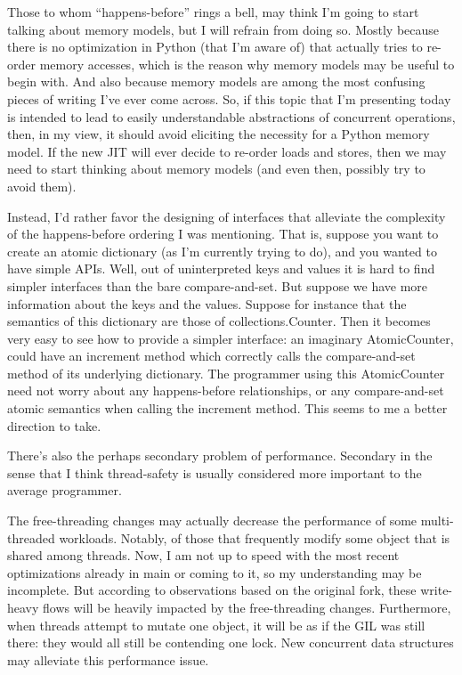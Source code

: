 Those to whom ``happens-before'' rings a bell, may think I'm going to start talking about memory models, but I will refrain from doing so.
Mostly because there is no optimization in Python (that I'm aware of) that actually tries to re-order memory accesses, which is the reason why memory models may be useful to begin with.
And also because memory models are among the most confusing pieces of writing I've ever come across.
So, if this topic that I'm presenting today is intended to lead to easily understandable abstractions of concurrent operations, then, in my view, it should avoid eliciting the necessity for a Python memory model.
If the new JIT will ever decide to re-order loads and stores, then we may need to start thinking about memory models (and even then, possibly try to avoid them).

Instead, I'd rather favor the designing of interfaces that alleviate the complexity of the happens-before ordering I was mentioning.
That is, suppose you want to create an atomic dictionary (as I'm currently trying to do), and you wanted to have simple APIs.
Well, out of uninterpreted keys and values it is hard to find simpler interfaces than the bare compare-and-set.
But suppose we have more information about the keys and the values.
Suppose for instance that the semantics of this dictionary are those of collections.Counter.
Then it becomes very easy to see how to provide a simpler interface: an imaginary AtomicCounter, could have an increment method which correctly calls the compare-and-set method of its underlying dictionary.
The programmer using this AtomicCounter need not worry about any happens-before relationships, or any compare-and-set atomic semantics when calling the increment method.
This seems to me a better direction to take.

There's also the perhaps secondary problem of performance.
Secondary in the sense that I think thread-safety is usually considered more important to the average programmer.

 The free-threading changes may actually decrease the performance of some multi-threaded workloads.
Notably, of those that frequently modify some object that is shared among threads.
Now, I am not up to speed with the most recent optimizations already in main or coming to it, so my understanding may be incomplete.
But according to observations based on the original fork, these write-heavy flows will be heavily impacted by the free-threading changes.
Furthermore, when threads attempt to mutate one object, it will be as if the GIL was still there: they would all still be contending one lock.
New concurrent data structures may alleviate this performance issue.

